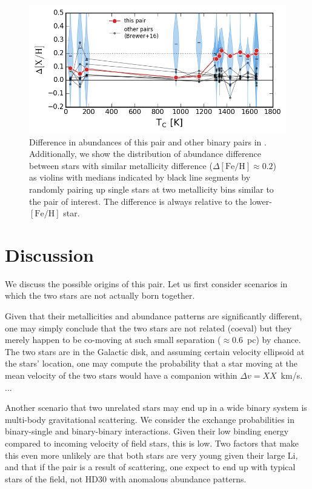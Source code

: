 \documentclass[manuscript]{aastex6}
\newcommand*\elem[1]{\ensuremath{\mathrm{#1}}}
\begin{document}
\begin{figure}[htpb]
  \centering
  \includegraphics[width=0.9\linewidth]{deltaXH_Tc_violins.png}
  \caption{Difference in abundances of this pair and other binary pairs in
    \citealt{2016ApJS..225...32B}.
    Additionally, we show the distribution of abundance difference
    between stars with similar metallicity difference
    ($\Delta[\elem{Fe}/\elem{H}] \approx 0.2$)
    as violins with medians indicated by black line segments
    by randomly pairing up single stars at two metallicity bins similar to
    the pair of interest.
    The difference is always relative to the lower-$[\elem{Fe}/\elem{H}]$ star.
  }
  \label{fig:deltaXH}
\end{figure}

\section{Discussion}
\label{sec:discussion}

We discuss the possible origins of this pair.
Let us first consider scenarios in which the two stars are not actually born together.

Given that their metallicities and abundance patterns are significantly
different, one may simply conclude that the two stars are not related (coeval)
but they merely happen to be co-moving at such small separation ($\approx 0.6$~pc)
by chance.
The two stars are in the Galactic disk, and assuming certain velocity ellipsoid
at the stars' location, one may compute the probability that a star moving at
the mean velocity of the two stars would have a companion within $\Delta v = XX$~km/s.
...

Another scenario that two unrelated stars may end up in a wide binary system
is multi-body gravitational scattering.
We consider the exchange probabilities in binary-single and binary-binary interactions.
Given their low binding energy compared to incoming velocity of field stars,
this is low.
Two factors that make this even more unlikely are that both stars are very young given their large Li,
and that if the pair is a result of scattering, one expect to end up with typical stars of the field,
not HD30 with anomalous abundance patterns.
\end{document}
